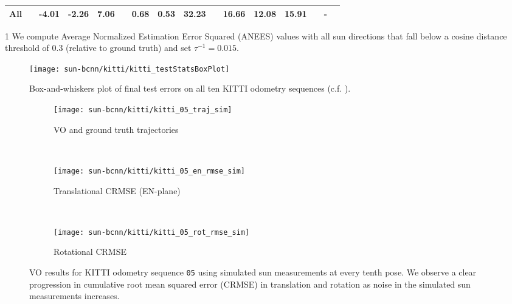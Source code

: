 \begin{table}
{\begin{threeparttable}
\begin{tabular}{@{}cccccccccccccccc@{}}
All                &  & -4.01  & -2.26  & 7.06           &  & 0.68   & 0.53   & 32.23           &  & 16.66 & 12.08  & 15.91 & & - &  \\ \bottomrule    
\end{tabular}
\begin{tablenotes}
	\item[1] We compute Average Normalized Estimation Error Squared (ANEES) values with all sun directions that fall below a cosine distance threshold of $0.3$ (relative to ground truth) and set $\tau^{-1} = 0.015$.
 \end{tablenotes}
\end{threeparttable}
}
\end{table}

\begin{figure}
    \centering
    \texttt{[image: sun-bcnn/kitti/kitti\_testStatsBoxPlot]}
    \caption{Box-and-whiskers plot of final test errors on all ten KITTI odometry sequences (c.f. ).}
    \label{fig:kitti_test_error_whiskers}
\end{figure}

\begin{figure}
	\centering
	 \begin{subfigure}{0.48 \textwidth}
    	\texttt{[image: sun-bcnn/kitti/kitti\_05\_traj\_sim]}
        \caption{VO and ground truth trajectories}
    \end{subfigure}
    ~
    \begin{subfigure}{0.48\textwidth}
    	\vspace{-8pt}
    	\texttt{[image: sun-bcnn/kitti/kitti\_05\_en\_rmse\_sim]}
        \caption{Translational CRMSE (EN-plane)}
    \end{subfigure}
    ~
    \begin{subfigure}{0.48\textwidth}
    	\texttt{[image: sun-bcnn/kitti/kitti\_05\_rot\_rmse\_sim]}
        \caption{Rotational CRMSE}
    \end{subfigure}

    \caption{VO results for KITTI odometry sequence \texttt{05} using simulated sun measurements at every tenth pose. We observe a clear progression in cumulative root mean squared error (CRMSE) in translation and rotation as noise in the simulated sun measurements increases.}
     \label{fig:kitti-vo-sim-results}
\end{figure}

